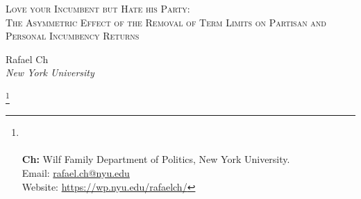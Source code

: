 \documentclass[12pt]{amsart}
\title{}
\numberwithin{equation}{section}
\theoremstyle{definition}
\theoremstyle{definition}
\theoremstyle{definition}
\begin{document}
	\vspace*{3ex minus 1ex}
	\begin{center}
		\Large \textsc{Love your Incumbent but Hate his Party: \\ The Asymmetric Effect of the Removal of Term Limits on Partisan and Personal Incumbency Returns}
	\end{center}
	
	
\date{May 14, 2021} 
\vspace*{3ex minus 1ex}
	\begin{center}
		Rafael Ch\\
		
		\textit{New York University}\\
		
	\end{center}
	 
	\thanks{%
	\\
	 \\ \textbf{Ch:} Wilf Family Department of Politics, New York University. \\ Email: \url{rafael.ch@nyu.edu}
	 \\ Website: \url{https://wp.nyu.edu/rafaelch/}}
		  
\end{document}

